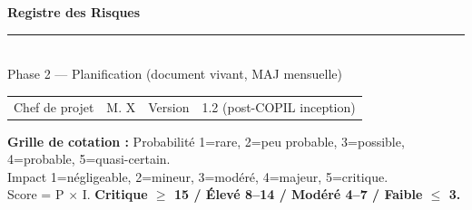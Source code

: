 \documentclass[11pt,a4paper,oneside]{report}
\begin{document}
\small

\begin{center}
{\LARGE\bfseries\color{cnNavy} Registre des Risques}\\[4pt]
\textcolor{cnOrange}{\rule{10cm}{1pt}}\\[4pt]
{\large\color{cnSlate} Phase 2 --- Planification (document vivant, MAJ mensuelle)}
\end{center}

\vspace{4pt}
\renewcommand{\arraystretch}{1.4}
\begin{tabularx}{\textwidth}{L{3.5cm} Y L{3.5cm} Y}
\toprule
{} &  &  &  \\
\midrule
Chef de projet  & M. X & Version & 1.2 (post-COPIL inception) \\
\bottomrule
\end{tabularx}

\vspace{6pt}
\begin{finding}
\textbf{Grille de cotation :}
Probabilité 1=rare, 2=peu probable, 3=possible, 4=probable, 5=quasi-certain. \\
Impact 1=négligeable, 2=mineur, 3=modéré, 4=majeur, 5=critique. \\
Score = P $\times$ I. \textbf{Critique $\geq$ 15 / Élevé 8--14 / Modéré 4--7 / Faible $\leq$ 3.}
\end{finding}
\end{document}
